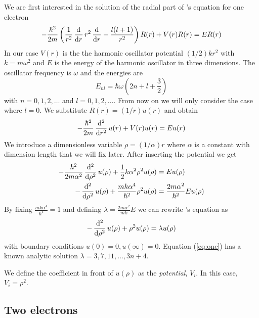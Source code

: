 \documentclass[a4paper]{revtex4}
\begin{document}
We are first interested in the solution of the radial part of \se's equation
for one electron
\begin{equation}
  -\frac{\hbar^2}{2m}
  \left(
    \frac{1}{r^2}
    \dod{}{r}
    r^2
    \dod{}{r}
    -
    \frac{l(l + 1)}{r^2}
  \right)
  R(r) + V(r)R(r)
  = ER(r)
\end{equation}
In our case $V(r)$ is the the harmonic oscillator potential $(1/2)kr^2$ with
$k = m\omega^2$ and $E$ is the energy of the harmonic oscillator in three
dimensions. The oscillator frequency is $\omega$ and the energies are
\begin{equation}
  E_{nl} = \hbar\omega
  \left(
    2n + l + \frac{3}{2}
  \right)
\end{equation}
with $n = 0, 1, 2, \dots$ and $l = 0, 1, 2, \dots$. From now on we will only
consider the case where $l = 0$. We substitute $R(r) = (1/r) u(r)$ and obtain
\begin{equation}
  -\frac{\hbar^2}{2m}
  \dod[2]{}{r}
  u(r)
  +
  V(r)u(r)
  =
  Eu(r)
\end{equation}
We introduce a dimensionless variable $\rho = (1/\alpha)r$ where $\alpha$ is a
constant with dimension length that we will fix later. After inserting the
potential we get
\begin{align}
  \label{eq:one-pot}
  -\frac{\hbar^2}{2m\alpha^2}
  \dod[2]{}{\rho}
  u(\rho)
  +
  \frac{1}{2}
  k \alpha^2 \rho^2
  u(\rho)
  &=
  Eu(\rho)\\
  -\dod[2]{}{\rho}
  u(\rho)
  +
  \frac{mk \alpha^4}{\hbar^2}
  \rho^2
  u(\rho)
  & =
  \frac{2m\alpha^2}{\hbar^2}
  Eu(\rho)
\end{align}
By fixing $\frac{mk \alpha^4}{\hbar^4} = 1$ and defining $\lambda =
\frac{2m\alpha^2}{mk}E$ we can rewrite \se's equation as
\begin{equation} \label{eq:one}
  -\dod[2]{}{\rho}
  u(\rho)
  + \rho^2 u(\rho)
  =
  \lambda u(\rho)
\end{equation}
with boundary conditions $u(0) = 0, u(\infty) = 0$.
Equation (\ref{eq:one}) has a known analytic solution $\lambda = 3, 7, 11, \dots, 3n + 4$.

We define the coefficient in front of $u(\rho)$ as the \emph{potential},
$V_i$. In this case, $V_i = \rho^2$.

\subsection{Two electrons}
\end{document}
